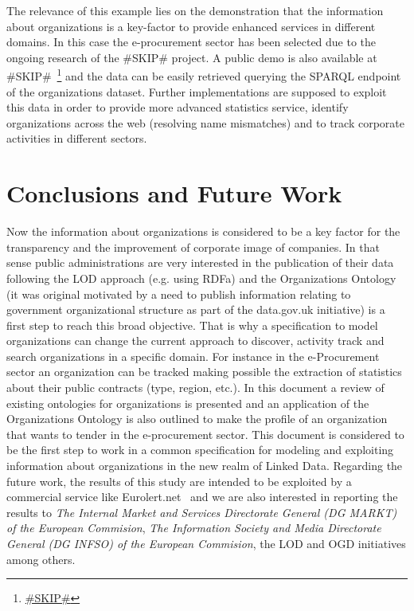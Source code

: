 \documentclass{llncs}
\begin{document}
The relevance of this example lies on the demonstration that the information about organizations
is a key-factor to provide enhanced services in different domains. In this case the e-procurement
sector has been selected due to the ongoing research of the \#SKIP\# project. A public demo is also available
at \#SKIP\#~\footnote{\url{\#SKIP\#}} and the data can be easily retrieved querying the SPARQL endpoint of
the organizations dataset. Further implementations are supposed to exploit this data in order to provide more advanced
statistics service, identify organizations across the web (resolving name mismatches) and to track corporate
activities in different sectors.
\section{Conclusions and Future Work}
Now the information about organizations is considered to be a key factor for the transparency 
and the improvement of corporate image of companies. In that sense public administrations are 
very interested in the publication of their data following the LOD approach (e.g. using RDFa) and the Organizations Ontology 
(it was original motivated by a need to publish information relating to government organizational 
structure as part of the data.gov.uk initiative) is a first step to reach this broad objective. That is why a 
specification to model organizations can change the current approach to discover, activity track and search organizations 
in a specific domain. For instance in the e-Procurement sector an organization can be tracked 
making possible the extraction of statistics about their public contracts (type, region, etc.). 
In this document a review of existing ontologies for organizations is presented and an application of the Organizations Ontology 
is also outlined to make the profile of an organization that wants to tender in the e-procurement sector.
 This document is considered to be the first step to work in a common specification for modeling and exploiting
information about organizations in the new realm of Linked Data. Regarding the future work, the results of this study are intended to be
exploited by a commercial service like Eurolert.net~\cite{web20} and we are also interested in reporting the 
results to \textit{The Internal Market and Services Directorate General (DG MARKT) of the European Commision},  
\textit{The Information Society and Media Directorate General (DG INFSO) of the European Commision}, 
the LOD and OGD initiatives among others.


%
%

\renewcommand{\bibname}{References}
\end{document}
